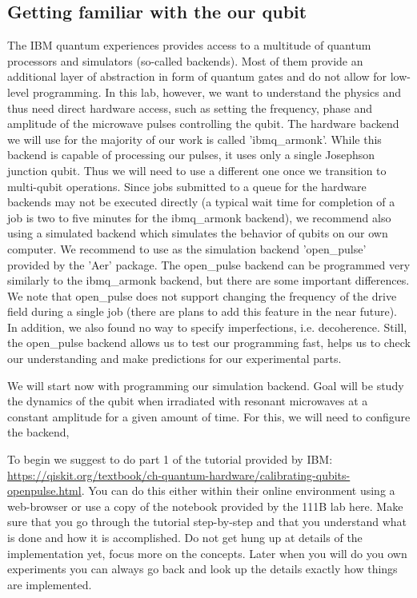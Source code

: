 \documentclass{../lab}
\begin{document}
\subsection{Getting familiar with the our qubit}
The IBM quantum experiences provides access to a multitude of quantum processors and simulators (so-called backends). Most of them provide an additional layer of abstraction in form of quantum gates and do not allow for low-level programming. In this lab, however, we want to understand the physics and thus need direct hardware access, such as setting the frequency, phase and amplitude of the microwave pulses controlling the qubit. The hardware backend we will use for the majority of our work is called 'ibmq\_armonk'. While this backend is capable of processing our pulses, it uses only a single Josephson junction qubit. Thus we will need to use a different one once we transition to multi-qubit operations. Since jobs submitted to a queue for the hardware backends may not be executed directly (a typical wait time for completion of a job is two to five minutes for the ibmq\_armonk backend), we recommend also using a simulated backend which simulates the behavior of qubits on our own computer. We recommend to use as the simulation backend 'open\_pulse' provided by the 'Aer' package. The open\_pulse backend can be programmed very similarly to the ibmq\_armonk backend, but there are some important differences. We note that open\_pulse does not support changing the frequency of the drive field during a single job (there are plans to add this feature in the near future). In addition, we also found no way to specify imperfections, i.e. decoherence. Still, the open\_pulse backend allows us to test our programming fast, helps us to check our understanding and make predictions for our experimental parts.

We will start now with programming our simulation backend. Goal will be study the dynamics of the qubit when irradiated with resonant microwaves at a constant amplitude for a given amount of time. For this, we will need to configure the backend, 


To begin we suggest to do part 1 of the tutorial provided by IBM: \url{https://qiskit.org/textbook/ch-quantum-hardware/calibrating-qubits-openpulse.html}. You can do this either within their online environment using a web-browser or use a copy of the notebook provided by the 111B lab here.
Make sure that you go through the tutorial step-by-step and that you understand what is done and how it is accomplished. Do not get hung up at details of the implementation yet, focus more on the concepts. Later when you will do you own experiments you can always go back and look up the details exactly how things are implemented. 
\end{document}
